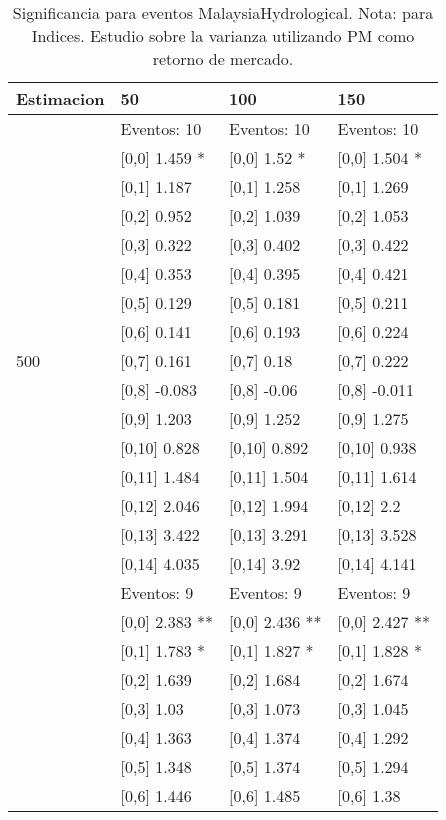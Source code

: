 \begin{table}

\caption{Significancia para eventos MalaysiaHydrological. Nota: para Indices. Estudio sobre la varianza utilizando PM como retorno de mercado.}
\centering
\begin{tabular}[t]{llll}
\toprule
Estimacion & 50 & 100 & 150\\
\midrule
 & Eventos:  10 & Eventos:  10 & Eventos:  10\\
 & {}[0,0] 1.459 * & {}[0,0] 1.52 * & {}[0,0] 1.504 *\\
 & {}[0,1] 1.187 & {}[0,1] 1.258 & {}[0,1] 1.269\\
 & {}[0,2] 0.952 & {}[0,2] 1.039 & {}[0,2] 1.053\\
 & {}[0,3] 0.322 & {}[0,3] 0.402 & {}[0,3] 0.422\\
\addlinespace
 & {}[0,4] 0.353 & {}[0,4] 0.395 & {}[0,4] 0.421\\
 & {}[0,5] 0.129 & {}[0,5] 0.181 & {}[0,5] 0.211\\
 & {}[0,6] 0.141 & {}[0,6] 0.193 & {}[0,6] 0.224\\
500 & {}[0,7] 0.161 & {}[0,7] 0.18 & {}[0,7] 0.222\\
 & {}[0,8] -0.083 & {}[0,8] -0.06 & {}[0,8] -0.011\\
\addlinespace
 & {}[0,9] 1.203 & {}[0,9] 1.252 & {}[0,9] 1.275\\
 & {}[0,10] 0.828 & {}[0,10] 0.892 & {}[0,10] 0.938\\
 & {}[0,11] 1.484 & {}[0,11] 1.504 & {}[0,11] 1.614\\
 & {}[0,12] 2.046 & {}[0,12] 1.994 & {}[0,12] 2.2\\
 & {}[0,13] 3.422 & {}[0,13] 3.291 & {}[0,13] 3.528\\
\addlinespace
 & {}[0,14] 4.035 & {}[0,14] 3.92 & {}[0,14] 4.141\\
 & Eventos:  9 & Eventos:  9 & Eventos:  9\\
 & {}[0,0] 2.383 ** & {}[0,0] 2.436 ** & {}[0,0] 2.427 **\\
 & {}[0,1] 1.783 * & {}[0,1] 1.827 * & {}[0,1] 1.828 *\\
 & {}[0,2] 1.639 & {}[0,2] 1.684 & {}[0,2] 1.674\\
\addlinespace
 & {}[0,3] 1.03 & {}[0,3] 1.073 & {}[0,3] 1.045\\
 & {}[0,4] 1.363 & {}[0,4] 1.374 & {}[0,4] 1.292\\
 & {}[0,5] 1.348 & {}[0,5] 1.374 & {}[0,5] 1.294\\
 & {}[0,6] 1.446 & {}[0,6] 1.485 & {}[0,6] 1.38\\

\end{tabular}
\end{table}
